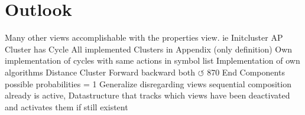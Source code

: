 \documentclass[preview]{standalone}
\begin{document}
\section{Outlook}
Many other views accomplishable with the properties view. ie Initcluster
AP Cluster has Cycle
All implemented Clusters in Appendix (only definition)
Own implementation of cycles with same actions
\intmodn {} \natnums in symbol list
Implementation of own algorithms
Distance Cluster Forward backward both
$\circlearrowleft$
870 End Components possible
probabilities = 1
Generalize disregarding views
sequential composition
already is active, Datastructure that tracks which views have been deactivated and activates them if still existent
\end{document}
